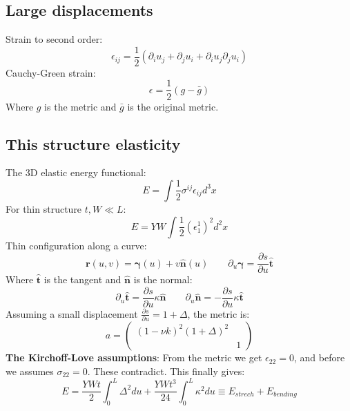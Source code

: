\documentclass[twocolumn]{article}
\begin{document}
\subsection{Large displacements}
Strain to second order:
\begin{equation}
    \epsilon_{ij} = \frac{1}{2}\left(\partial_i u_j + \partial_j u_i + \partial_i u_j \partial_j u_i\right)
\end{equation}
Cauchy-Green strain:
\begin{equation}
    \epsilon = \frac{1}{2}\left(g - \bar{g}\right)
\end{equation}
Where $g$ is the metric and $\bar{g}$ is the original metric.
\subsection{This structure elasticity}
The 3D elastic energy functional:
\begin{equation}
    E = \int \frac{1}{2}\sigma^{ij}\epsilon_{ij}d^3x
\end{equation}
For thin structure $t, W \ll L$:
\begin{equation}
    E = YW\int \frac{1}{2}(\epsilon^1_1)^2 d^2x
\end{equation}
Thin configuration along a curve:
\begin{equation}
    \boldsymbol{r}(u, v) = \boldsymbol{\gamma}(u) + v\hat{\boldsymbol{n}}(u)
    \qquad
    \partial_u \boldsymbol{\gamma} = \frac{\partial s}{\partial u}\hat{\boldsymbol{t}}
\end{equation}
Where $\hat{\boldsymbol{t}}$ is the tangent and $\hat{\boldsymbol{n}}$ is the normal:
\begin{equation}
    \partial_u \hat{\boldsymbol{t}} = \frac{\partial s}{\partial u} \kappa \hat{\boldsymbol{n}}
    \qquad
    \partial_u \hat{\boldsymbol{n}} = -\frac{\partial s}{\partial u} \kappa \hat{\boldsymbol{t}}
\end{equation}
Assuming a small displacement $\frac{\partial s}{\partial u} = 1 + \Delta$, the metric is:
\begin{equation}
    a = \begin{pmatrix}
        (1 - \nu k)^2(1 + \Delta)^2 & \\ & 1
    \end{pmatrix}
\end{equation}
\textbf{The Kirchoff-Love assumptions}:
\newline
From the metric we get $\epsilon_{22} = 0$, and before we assumes $\sigma_{22} = 0$. These contradict. This finally gives:
\begin{equation}
    E = \frac{YWt}{2}\int_0^L \Delta^2 du + \frac{YWt^3}{24}\int_0^L \kappa^2 du \equiv E_{strech} + E_{bending}
\end{equation}
\end{document}

